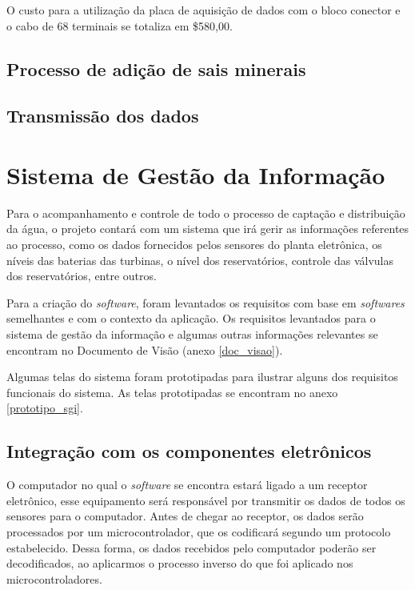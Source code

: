 	O custo para a utilização da placa de aquisição de dados com o bloco conector e o cabo de 68 terminais se totaliza em \$580,00.
	
    \pagebreak
    \subsection{Processo de adição de sais minerais}
    
      
      
    \subsection{Transmissão dos dados}
    
      
    
  \vfill
  \pagebreak
  \section{Sistema de Gestão da Informação}
      
     Para o acompanhamento e controle de todo o processo de captação e distribuição da água, o projeto contará com um sistema 
     que irá gerir as informações referentes ao processo, como os dados fornecidos pelos sensores do planta eletrônica,
     os níveis das baterias das turbinas, o nível dos reservatórios, controle das válvulas dos reservatórios, entre outros.
     
     Para a criação do \textit{software}, foram levantados os requisitos com base em \textit{softwares} semelhantes
     e com o contexto da aplicação. Os requisitos levantados para o sistema de gestão da informação e algumas outras informações
     relevantes se encontram no Documento de Visão (anexo \ref{doc_visao}).
     
     Algumas telas do sistema foram prototipadas para ilustrar alguns dos requisitos funcionais do sistema. As telas prototipadas se 
     encontram no anexo \ref{prototipo_sgi}.
     
     \subsection{Integração com os componentes eletrônicos}
     
      O computador no qual o \textit{software} se encontra estará ligado a um receptor eletrônico, esse equipamento será responsável por transmitir os dados de todos os sensores para o computador. Antes de chegar ao receptor, os dados serão processados por um microcontrolador, que os codificará segundo um protocolo estabelecido. Dessa forma, os dados recebidos pelo computador poderão ser decodificados, ao aplicarmos o processo inverso do que foi aplicado nos microcontroladores.
      

